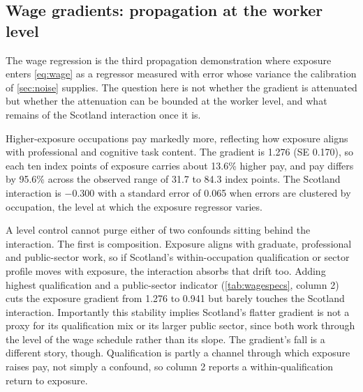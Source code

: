 \subsection{Wage gradients: propagation at the worker level}\label{sec:wages}

The wage regression is the third propagation demonstration where exposure enters \cref{eq:wage} as a regressor measured with error whose variance the calibration of \cref{sec:noise} supplies. The question here is not whether the gradient is attenuated but whether the attenuation can be bounded at the worker level, and what remains of the Scotland interaction once it is.

Higher-exposure occupations pay markedly more, reflecting how exposure aligns with professional and cognitive task content. The gradient is 1.276 (SE 0.170), so each ten index points of exposure carries about 13.6\% higher pay, and pay differs by 95.6\% across the observed range of 31.7 to 84.3 index points. The Scotland interaction is $-0.300$ with a standard error of 0.065 when errors are clustered by occupation, the level at which the exposure regressor varies.

A level control cannot purge either of two confounds sitting behind the interaction. The first is composition. Exposure aligns with graduate, professional and public-sector work, so if Scotland's within-occupation qualification or sector profile moves with exposure, the interaction absorbs that drift too. Adding highest qualification and a public-sector indicator (\cref{tab:wagespecs}, column 2) cuts the exposure gradient from 1.276 to 0.941 but barely touches the Scotland interaction. Importantly this stability implies Scotland's flatter gradient is not a proxy for its qualification mix or its larger public sector, since both work through the level of the wage schedule rather than its slope. The gradient's fall is a different story, though. Qualification is partly a channel through which exposure raises pay, not simply a confound, so column 2 reports a within-qualification return to exposure.

